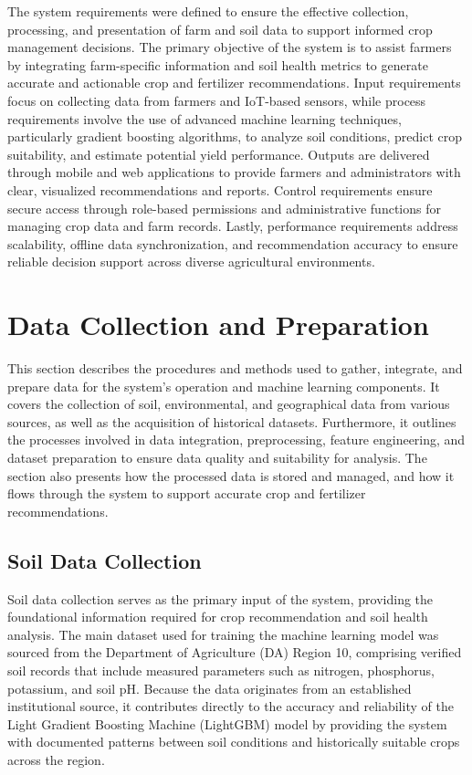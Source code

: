 {	
	The system requirements were defined to ensure the effective collection, processing, and presentation of farm and soil data to support informed crop management decisions. The primary objective of the system is to assist farmers by integrating farm-specific information and soil health metrics to generate accurate and actionable crop and fertilizer recommendations. Input requirements focus on collecting data from farmers and IoT-based sensors, while process requirements involve the use of advanced machine learning techniques, particularly gradient boosting algorithms, to analyze soil conditions, predict crop suitability, and estimate potential yield performance. Outputs are delivered through mobile and web applications to provide farmers and administrators with clear, visualized recommendations and reports. Control requirements ensure secure access through role-based permissions and administrative functions for managing crop data and farm records. Lastly, performance requirements address scalability, offline data synchronization, and recommendation accuracy to ensure reliable decision support across diverse agricultural environments.
	
	\section{Data Collection and Preparation}
	This section describes the procedures and methods used to gather, integrate, and prepare data for the system's operation and machine learning components. It covers the collection of soil, environmental, and geographical data from various sources, as well as the acquisition of historical datasets. Furthermore, it outlines the processes involved in data integration, preprocessing, feature engineering, and dataset preparation to ensure data quality and suitability for analysis. The section also presents how the processed data is stored and managed, and how it flows through the system to support accurate crop and fertilizer recommendations.
	
	\subsection{Soil Data Collection}
	Soil data collection serves as the primary input of the system, providing the foundational information required for crop recommendation and soil health analysis. The main dataset used for training the machine learning model was sourced from the Department of Agriculture (DA) Region 10, comprising verified soil records that include measured parameters such as nitrogen, phosphorus, potassium, and soil pH. Because the data originates from an established institutional source, it contributes directly to the accuracy and reliability of the Light Gradient Boosting Machine (LightGBM) model by providing the system with documented patterns between soil conditions and historically suitable crops across the region.
	
}
